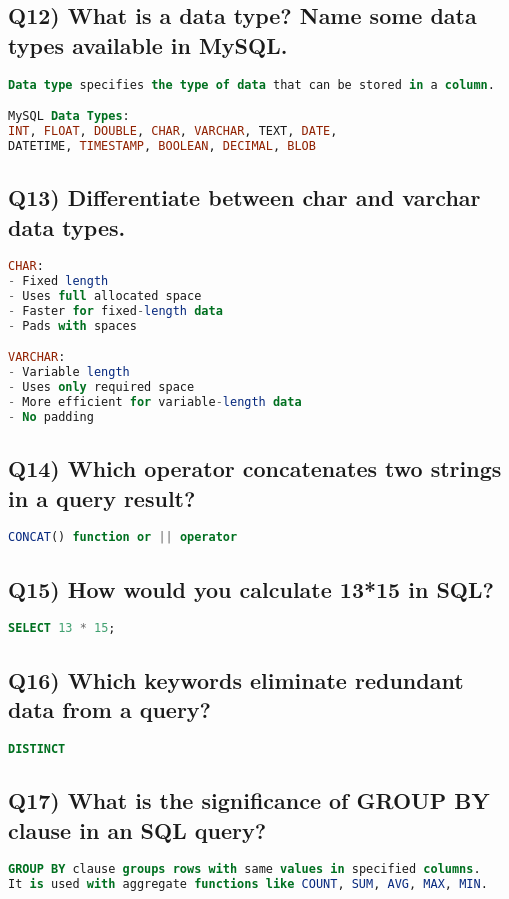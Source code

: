 \documentclass{article}
\begin{document}
\subsection*{Q12) What is a data type? Name some data types available in MySQL.}
\begin{lstlisting}[language=SQL]
Data type specifies the type of data that can be stored in a column.

MySQL Data Types:
INT, FLOAT, DOUBLE, CHAR, VARCHAR, TEXT, DATE, 
DATETIME, TIMESTAMP, BOOLEAN, DECIMAL, BLOB
\end{lstlisting}

\subsection*{Q13) Differentiate between char and varchar data types.}
\begin{lstlisting}[language=SQL]
CHAR:
- Fixed length
- Uses full allocated space
- Faster for fixed-length data
- Pads with spaces

VARCHAR:
- Variable length
- Uses only required space
- More efficient for variable-length data
- No padding
\end{lstlisting}

\subsection*{Q14) Which operator concatenates two strings in a query result?}
\begin{lstlisting}[language=SQL]
CONCAT() function or || operator
\end{lstlisting}

\subsection*{Q15) How would you calculate 13*15 in SQL?}
\begin{lstlisting}[language=SQL]
SELECT 13 * 15;
\end{lstlisting}

\subsection*{Q16) Which keywords eliminate redundant data from a query?}
\begin{lstlisting}[language=SQL]
DISTINCT
\end{lstlisting}

\subsection*{Q17) What is the significance of GROUP BY clause in an SQL query?}
\begin{lstlisting}[language=SQL]
GROUP BY clause groups rows with same values in specified columns.
It is used with aggregate functions like COUNT, SUM, AVG, MAX, MIN.
\end{lstlisting}
\end{document}
